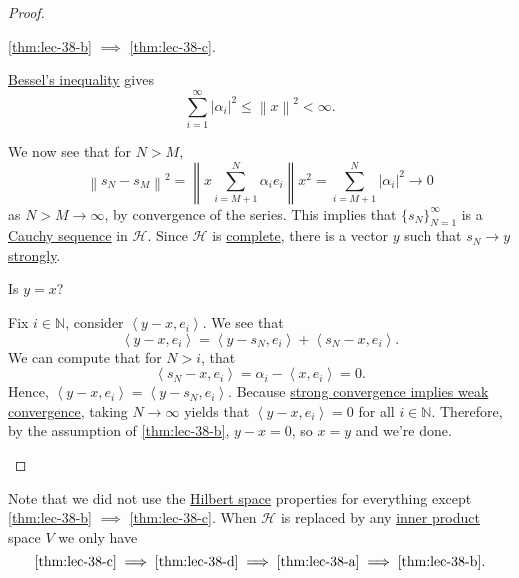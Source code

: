 \begin{proof}
	\begin{claim}
		\autoref{thm:lec-38-b} \(\implies \) \autoref{thm:lec-38-c}.
	\end{claim}
	\begin{explanation}
		\hyperref[lma:Bessel-inequality]{Bessel's inequality} gives
		\[
			\sum_{i=1}^\infty \left\vert \alpha_i \right\vert ^2 \leq \left\lVert x\right\rVert^2 < \infty.
		\]

		We now see that for \(N > M\),
		\[
			\left\lVert s_N - s_M\right\rVert^2 = \left\lVert x \sum_{i=M + 1}^N \alpha_i e_i\right\rVert x ^2 = \sum_{i=M+1}^N \left\vert \alpha_i \right\vert ^2 \to 0
		\]
		as \(N > M \to \infty\), by convergence of the series. This implies that \(\{s_N\}_{N=1}^\infty\) is a \hyperref[def:Cauchy-sequence]{Cauchy sequence} in \(\mathcal{H}\). Since \(\mathcal{H}\) is \hyperref[def:complete]{complete}, there is a vector \(y\) such that \hyperref[def:strong-convergence]{\(s_N \to y\) strongly}.

		\begin{problem*}
			Is \(y = x\)?
		\end{problem*}
		\begin{answer}
			Fix \(i \in \mathbb{N}\), consider \(\left< y-x, e_i \right>\). We see that
			\[
				\left< y-x,e_i \right> = \left< y-s_N,e_i \right> + \left< s_N - x, e_i \right>.
			\]
			We can compute that for \(N > i\), that
			\[
				\left< s_N - x, e_i \right> = \alpha_i - \left< x,e_i \right>  = 0.
			\]
			Hence, \(\left< y -x,e_i \right> = \left< y-s_N,e_i \right>\). Because \hyperref[lma:strong-convergence-implies-weak-convergence]{strong convergence implies weak convergence}, taking \(N \to \infty\) yields that \(\left< y-x,e_i \right> = 0\) for all \(i \in \mathbb{N}\). Therefore, by the assumption of \autoref{thm:lec-38-b}, \(y -x = 0\), so \(x = y\) and we're done.
		\end{answer}
	\end{explanation}
\end{proof}

\begin{remark}
	Note that we did not use the \hyperref[def:Hilbert-space]{Hilbert space} properties for everything except \autoref{thm:lec-38-b} \(\implies \) \autoref{thm:lec-38-c}. When \(\mathcal{H}\) is replaced by any \hyperref[def:inner-product]{inner product} space \(V\) we only have
	\[
		\text{\autoref{thm:lec-38-c}}
		\implies \text{\autoref{thm:lec-38-d}}
		\implies \text{\autoref{thm:lec-38-a}}
		\implies \text{\autoref{thm:lec-38-b}}.
	\]
\end{remark}

